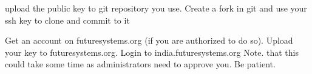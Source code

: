 \begin{exercise}
\label{E:SSH.2} upload the public key to git repository you use. Create a fork in
  git and use your ssh key to clone and commit to it
\end{exercise}

\begin{exercise}
\label{E:SSH.3} Get an account on futuresystems.org (if you are
  authorized to do so).  Upload your key to futuresystems.org. Login
  to india.futuresystems.org Note. that this could take some time as
  administrators need to approve you. Be patient.
\end{exercise}




